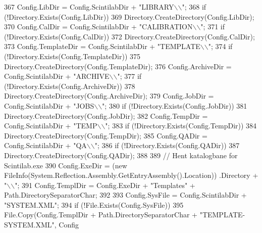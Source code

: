 \begin{DoxyCode}
367                 Config.LibDir = Config.ScintilabDir + \textcolor{stringliteral}{"LIBRARY\(\backslash\)\(\backslash\)"};
368                 \textcolor{keywordflow}{if} (!Directory.Exists(Config.LibDir))
369                     Directory.CreateDirectory(Config.LibDir);
370                 Config.CalDir = Config.ScintilabDir + \textcolor{stringliteral}{"CALIBRATION\(\backslash\)\(\backslash\)"};
371                 \textcolor{keywordflow}{if} (!Directory.Exists(Config.CalDir))
372                     Directory.CreateDirectory(Config.CalDir);
373                 Config.TemplateDir = Config.ScintilabDir + \textcolor{stringliteral}{"TEMPLATE\(\backslash\)\(\backslash\)"};
374                 \textcolor{keywordflow}{if} (!Directory.Exists(Config.TemplateDir))
375                     Directory.CreateDirectory(Config.TemplateDir);
376                 Config.ArchiveDir = Config.ScintilabDir + \textcolor{stringliteral}{"ARCHIVE\(\backslash\)\(\backslash\)"};
377                 \textcolor{keywordflow}{if} (!Directory.Exists(Config.ArchiveDir))
378                     Directory.CreateDirectory(Config.ArchiveDir);
379                 Config.JobDir = Config.ScintilabDir + \textcolor{stringliteral}{"JOBS\(\backslash\)\(\backslash\)"};
380                 \textcolor{keywordflow}{if} (!Directory.Exists(Config.JobDir))
381                     Directory.CreateDirectory(Config.JobDir);
382                 Config.TempDir = Config.ScintilabDir + \textcolor{stringliteral}{"TEMP\(\backslash\)\(\backslash\)"};
383                 \textcolor{keywordflow}{if} (!Directory.Exists(Config.TempDir))
384                     Directory.CreateDirectory(Config.TempDir);
385                 Config.QADir = Config.ScintilabDir + \textcolor{stringliteral}{"QA\(\backslash\)\(\backslash\)"};
386                 \textcolor{keywordflow}{if} (!Directory.Exists(Config.QADir))
387                     Directory.CreateDirectory(Config.QADir);
388 
389                 \textcolor{comment}{// Hent katalogbane for Scintilab.exe}
390                 Config.ExeDir = (\textcolor{keyword}{new} FileInfo(System.Reflection.Assembly.GetEntryAssembly().Location))
      .Directory + \textcolor{stringliteral}{"\(\backslash\)\(\backslash\)"};      
391                 Config.TemplDir = Config.ExeDir + \textcolor{stringliteral}{"Templates"} + Path.DirectorySeparatorChar; 
392 
393                 Config.SysFile = Config.ScintilabDir + \textcolor{stringliteral}{"SYSTEM.XML"};
394                 \textcolor{keywordflow}{if} (!File.Exists(Config.SysFile))
395                     File.Copy(Config.TemplDir + Path.DirectorySeparatorChar + \textcolor{stringliteral}{"TEMPLATE-SYSTEM.XML"}, Config

\end{DoxyCode}
